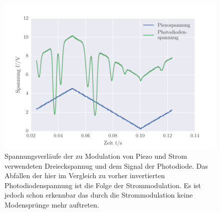 \FloatBarrier
\begin{figure}[!h]
\centering
\includegraphics[scale=1]{../Grafiken/Strommodulation.pdf}
\caption{Spannungsverläufe der zu Modulation von Piezo und Strom verwendeten 
	Dreieckspannug und dem Signal der Photodiode. Das Abfallen der hier im Vergleich
	zu vorher invertierten Photodiodenspannung ist die Folge der Strommodulation.
	Es ist jedoch schon erkennbar das durch die Strommodulation keine Modensprünge 
	mehr auftreten.
	\label{fig:strommodulation}}
\end{figure}
\FloatBarrier